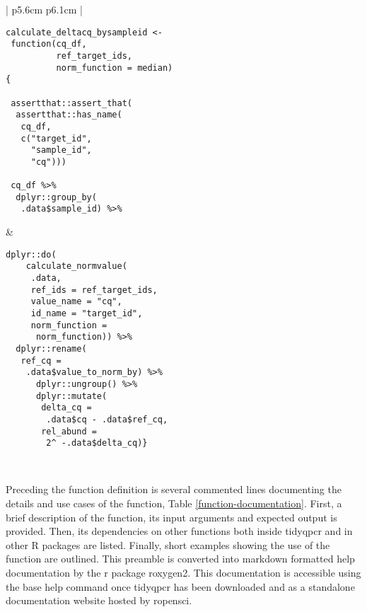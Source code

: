 \documentclass[../main.tex]{subfiles}
\begin{document}
\begin{table}
\centering
\begin{tabular}{| p{5.6cm}  p{6.1cm} |}
\hline
\begin{lstlisting}[style=mystyle]
calculate_deltacq_bysampleid <- 
 function(cq_df,
          ref_target_ids,
          norm_function = median) 
{

 assertthat::assert_that(
  assertthat::has_name(
   cq_df, 
   c("target_id",
     "sample_id",
     "cq")))
     
 cq_df %>%
  dplyr::group_by(
   .data$sample_id) %>%
\end{lstlisting} &

\begin{lstlisting}[firstnumber=17, style=mystyle]
   dplyr::do(
    calculate_normvalue(
     .data,
     ref_ids = ref_target_ids,
     value_name = "cq",
     id_name = "target_id",
     norm_function = 
      norm_function)) %>%
  dplyr::rename(
   ref_cq = 
    .data$value_to_norm_by) %>%
      dplyr::ungroup() %>%
      dplyr::mutate(
       delta_cq = 
        .data$cq - .data$ref_cq,
       rel_abund = 
        2^ -.data$delta_cq)}
\end{lstlisting} \\
\hline
\end{tabular}
\caption*{Function definition for the calculate $\Delta$Cq method within tidyqpcr.}
\label{define-function}
\end{table}
Preceding the function definition is several commented lines documenting the details and use cases of the function, Table \ref{function-documentation}. 
First, a brief description of the function, its input arguments and expected output is provided. 
Then, its dependencies on other functions both inside tidyqpcr and in other R packages are listed. 
Finally, short examples showing the use of the function are outlined. 
This preamble is converted into markdown formatted help documentation by the r package roxygen2. 
This documentation is accessible using the base help command once tidyqpcr has been downloaded and as a standalone documentation website hosted by ropensci.
\end{document}
